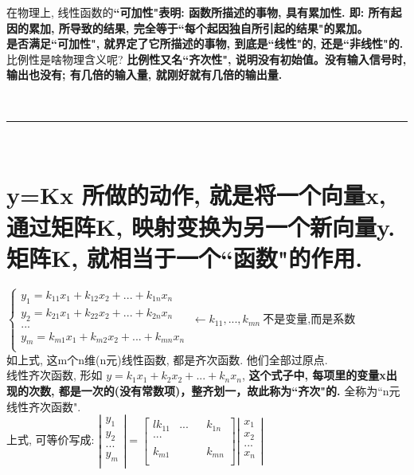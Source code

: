 \documentclass[UTF8]{ctexart}
\begin{document}
在物理上, 线性函数的\textbf{``可加性"表明: 函数所描述的事物, 具有累加性. 即: 所有起因的累加, 所导致的结果, 完全等于``每个起因独自所引起的结果"的累加。}\\
\textbf{是否满足``可加性", 就界定了它所描述的事物, 到底是``线性"的, 还是``非线性"的.}\\


比例性是啥物理含义呢? \textbf{比例性又名``齐次性", 说明没有初始值。没有输入信号时, 输出也没有; 有几倍的输入量, 就刚好就有几倍的输出量.}


~\\
\hrule
~\\


\section{y=Kx 所做的动作, 就是将一个向量x, 通过矩阵K, 映射变换为另一个新向量y. 矩阵K, 就相当于一个``函数"的作用.}

$
\left\{ \begin{array}{l}
	y_1=k_{11}x_1+k_{12}x_2+...+k_{1n}x_n\\
	y_2=k_{21}x_1+k_{22}x_2+...+k_{2n}x_n\\
	...\\
	y_m=k_{m1}x_1+k_{m2}x_2+...+k_{mn}x_n\\
\end{array} \right. \ ←k_{11},...,k_{mn}\ \text{不是变量,而是系数}
$\\

如上式, 这m个n维(n元)线性函数, 都是齐次函数. 他们全部过原点. \\
线性齐次函数, 形如 $	y=k_{1}x_1+k_{2}x_2+...+k_{n}x_n$, \textbf{这个式子中, 每项里的变量x出现的次数, 都是一次的(没有常数项)，整齐划一，故此称为``齐次"的.} 全称为``n元线性齐次函数". \\

上式, 可等价写成: 
$
\left| \begin{array}{l}
	y_1\\
	y_2\\
	...\\
	y_m\\
\end{array} \right|=\left[ \begin{matrix}{l}
	k_{11}&		...&		&		k_{1n}\\
	...&		&		&		\\
	&		&		&		\\
	k_{m1}&		&		&		k_{mn}\\
\end{matrix} \right] \left| \begin{array}{l}
	x_1\\
	x_2\\
	...\\
	x_n\\
\end{array} \right|
$ \\
\end{document}
